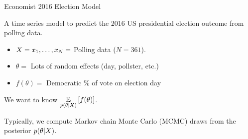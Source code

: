 
\begin{frame}{Economist 2016 Election Model \citep{economist:2020:election}}

\begin{minipage}[t]{0.35\textwidth}
    \ElectionData{}
\end{minipage}
\begin{minipage}{0.04\textwidth}
\hfill
\end{minipage}
\begin{minipage}[t]{0.59\textwidth}

A time series model to predict the 2016 US presidential election
outcome from polling data.

\spskip
\begin{itemize}
\item $X = x_1, \ldots, x_N =$ Polling data ($N = 361$).
\item $\theta = $ Lots of random effects (day, pollster, etc.)
\item $f(\theta) = $ Democratic \% of vote on election day
\end{itemize}



\end{minipage}

\spskip
We want to know $\underset{p(\theta \vert X)}{\mathbb{E}}\left[f(\theta)\right]$.

\spskip
Typically, we compute Markov chain Monte Carlo (MCMC) draws from the
posterior $p(\theta \vert X)$.


\end{frame}







